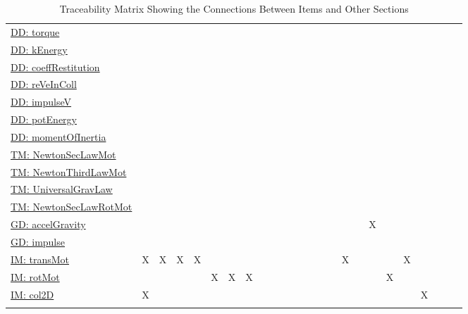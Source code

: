 \documentclass[12pt]{article}
\begin{document}
\begin{longtable}{l l l l l l l l l l l l l l l l l l l l l l l l l}
\hyperref[DD:torque]{DD: torque} &  &  &  &  &  &  &  &  &  &  &  &  &  &  &  &  &  &  &  &  &  &  &  & 
\\
\hyperref[DD:kEnergy]{DD: kEnergy} &  &  &  &  &  &  &  &  &  &  &  &  &  &  &  &  &  &  &  &  &  &  &  & 
\\
\hyperref[DD:coeffRestitution]{DD: coeffRestitution} &  &  &  &  &  &  &  &  &  &  &  &  &  &  &  &  &  &  &  &  &  &  &  & 
\\
\hyperref[DD:reVeInColl]{DD: reVeInColl} &  &  &  &  &  &  &  &  &  &  &  &  &  &  &  &  &  &  &  &  &  &  &  & 
\\
\hyperref[DD:impulseV]{DD: impulseV} &  &  &  &  &  &  &  &  &  &  &  &  &  &  &  &  &  &  &  &  &  &  &  & 
\\
\hyperref[DD:potEnergy]{DD: potEnergy} &  &  &  &  &  &  &  &  &  &  &  &  &  &  &  &  &  &  &  &  &  &  &  & 
\\
\hyperref[DD:momentOfInertia]{DD: momentOfInertia} &  &  &  &  &  &  &  &  &  &  &  &  &  &  &  &  &  &  &  &  &  &  &  & 
\\
\hyperref[TM:NewtonSecLawMot]{TM: NewtonSecLawMot} &  &  &  &  &  &  &  &  &  &  &  &  &  &  &  &  &  &  &  &  &  &  &  & 
\\
\hyperref[TM:NewtonThirdLawMot]{TM: NewtonThirdLawMot} &  &  &  &  &  &  &  &  &  &  &  &  &  &  &  &  &  &  &  &  &  &  &  & 
\\
\hyperref[TM:UniversalGravLaw]{TM: UniversalGravLaw} &  &  &  &  &  &  &  &  &  &  &  &  &  &  &  &  &  &  &  &  &  &  &  & 
\\
\hyperref[TM:NewtonSecLawRotMot]{TM: NewtonSecLawRotMot} &  &  &  &  &  &  &  &  &  &  &  &  &  &  &  &  &  &  &  &  &  &  &  & 
\\
\hyperref[GD:accelGravity]{GD: accelGravity} &  &  &  &  &  &  &  &  &  &  &  &  &  &  &  &  &  & X &  &  &  &  &  & 
\\
\hyperref[GD:impulse]{GD: impulse} &  &  &  &  &  &  &  &  &  &  &  &  &  &  &  &  &  &  &  &  &  &  &  & 
\\
\hyperref[IM:transMot]{IM: transMot} & X & X & X & X &  &  &  &  &  &  &  &  &  &  &  & X &  &  &  & X &  &  &  & 
\\
\hyperref[IM:rotMot]{IM: rotMot} &  &  &  &  & X & X & X &  &  &  &  &  &  &  &  &  &  &  & X &  &  &  &  & 
\\
\hyperref[IM:col2D]{IM: col2D} & X &  &  &  &  &  &  &  &  &  &  &  &  &  &  &  &  &  &  &  & X &  &  & 
\\
\bottomrule
\caption{Traceability Matrix Showing the Connections Between Items and Other Sections}
\label{Table:TraceMatRefvsRef}
\end{longtable}
\end{document}
